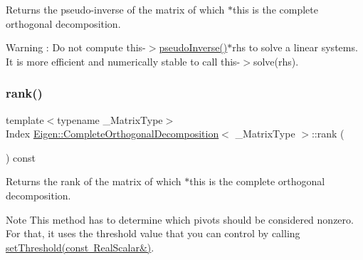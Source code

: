 \begin{DoxyReturn}{Returns}
the pseudo-\/inverse of the matrix of which $\ast$this is the complete orthogonal decomposition. 
\end{DoxyReturn}
\begin{DoxyWarning}{Warning}
\+: Do not compute {\ttfamily this-\/$>$\mbox{\hyperlink{class_eigen_1_1_complete_orthogonal_decomposition_a3c89639299720ce089435d26d6822d6f}{pseudo\+Inverse()}}$\ast$rhs} to solve a linear systems. It is more efficient and numerically stable to call {\ttfamily this-\/$>$solve(rhs)}. 
\end{DoxyWarning}
\mbox{\label{class_eigen_1_1_complete_orthogonal_decomposition_af348f64b26f8467a020062c22b748806}} 
\subsubsection{\texorpdfstring{rank()}{rank()}}
{\footnotesize\ttfamily template$<$typename \+\_\+\+Matrix\+Type$>$ \\
Index \mbox{\hyperlink{class_eigen_1_1_complete_orthogonal_decomposition}{Eigen\+::\+Complete\+Orthogonal\+Decomposition}}$<$ \+\_\+\+Matrix\+Type $>$\+::rank (\begin{DoxyParamCaption}{ }\end{DoxyParamCaption}) const\hspace{0.3cm}{\ttfamily [inline]}}

\begin{DoxyReturn}{Returns}
the rank of the matrix of which $\ast$this is the complete orthogonal decomposition.
\end{DoxyReturn}
\begin{DoxyNote}{Note}
This method has to determine which pivots should be considered nonzero. For that, it uses the threshold value that you can control by calling \mbox{\hyperlink{class_eigen_1_1_complete_orthogonal_decomposition_aa9c9f7cbde9d58ca5552381b70ad8d82}{set\+Threshold(const Real\+Scalar\&)}}. 
\end{DoxyNote}
\mbox{\label{class_eigen_1_1_complete_orthogonal_decomposition_aa9c9f7cbde9d58ca5552381b70ad8d82}} 
